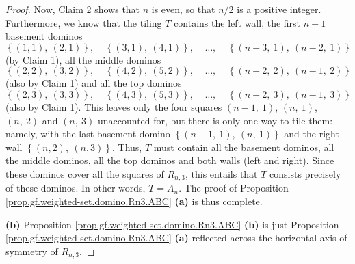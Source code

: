 \begin{fineprint}
\begin{proof}
Now, Claim 2 shows that $n$ is even, so that $n/2$ is a positive integer.
Furthermore, we know that the tiling $T$ contains the left wall, the first
$n-1$ basement dominos
\[
\left\{  \left(  1,1\right)  ,\ \left(  2,1\right)  \right\}
,\ \ \ \ \ \left\{  \left(  3,1\right)  ,\ \left(  4,1\right)  \right\}
,\ \ \ \ \ \ldots,\ \ \ \ \ \left\{  \left(  n-3,\ 1\right)  ,\ \left(
n-2,\ 1\right)  \right\}
\]
(by Claim 1), all the middle dominos
\[
\left\{  \left(  2,2\right)  ,\ \left(  3,2\right)  \right\}
,\ \ \ \ \ \left\{  \left(  4,2\right)  ,\ \left(  5,2\right)  \right\}
,\ \ \ \ \ \ldots,\ \ \ \ \ \left\{  \left(  n-2,\ 2\right)  ,\ \left(
n-1,\ 2\right)  \right\}
\]
(also by Claim 1) and all the top dominos%
\[
\left\{  \left(  2,3\right)  ,\ \left(  3,3\right)  \right\}
,\ \ \ \ \ \left\{  \left(  4,3\right)  ,\ \left(  5,3\right)  \right\}
,\ \ \ \ \ \ldots,\ \ \ \ \ \left\{  \left(  n-2,\ 3\right)  ,\ \left(
n-1,\ 3\right)  \right\}
\]
(also by Claim 1). This leaves only the four squares $\left(  n-1,\ 1\right)
$, $\left(  n,\ 1\right)  $, $\left(  n,\ 2\right)  $ and $\left(
n,\ 3\right)  $ unaccounted for, but there is only one way to tile them:
namely, with the last basement domino $\left\{  \left(  n-1,\ 1\right)
,\ \left(  n,\ 1\right)  \right\}  $ and the right wall $\left\{  \left(
n,2\right)  ,\ \left(  n,3\right)  \right\}  $. Thus, $T$ must contain all the
basement dominos, all the middle dominos, all the top dominos and both walls
(left and right). Since these dominos cover all the squares of $R_{n,3}$, this
entails that $T$ consists precisely of these dominos. In other words,
$T=A_{n}$. The proof of Proposition \ref{prop.gf.weighted-set.domino.Rn3.ABC}
\textbf{(a)} is thus complete. \medskip

\textbf{(b)} Proposition \ref{prop.gf.weighted-set.domino.Rn3.ABC}
\textbf{(b)} is just Proposition \ref{prop.gf.weighted-set.domino.Rn3.ABC}
\textbf{(a)} reflected across the horizontal axis of symmetry of $R_{n,3}$.
\end{proof}
\end{fineprint}
